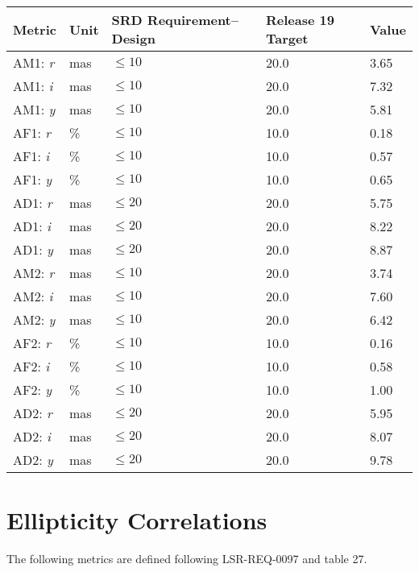 \documentclass[DM,lsstdraft,toc]{lsstdoc}
\begin{document}
\begin{longtable}{L{0.19\columnwidth}L{0.08\columnwidth}L{0.2\columnwidth}R{0.22\columnwidth}R{0.17\columnwidth}}
\toprule
Metric &
Unit &
SRD Requirement--Design &
Release 19 Target &
Value
\tabularnewline
\midrule
\endhead
AM1: \emph{r} &
mas &
\(\leq 10\) &
20.0 &
3.65
\tabularnewline
AM1: \emph{i} &
mas &
\(\leq 10\) &
20.0 &
7.32
\tabularnewline
AM1: \emph{y} &
mas &
\(\leq 10\) &
20.0 &
5.81
\tabularnewline
AF1: \emph{r} &
\% &
\(\leq 10\) &
10.0 &
0.18
\tabularnewline
AF1: \emph{i} &
\% &
\(\leq 10\) &
10.0 &
0.57
\tabularnewline
AF1: \emph{y} &
\% &
\(\leq 10\) &
10.0 &
0.65
\tabularnewline
AD1: \emph{r} &
mas &
\(\leq 20\) &
20.0 &
5.75
\tabularnewline
AD1: \emph{i} &
mas &
\(\leq 20\) &
20.0 &
8.22
\tabularnewline
AD1: \emph{y} &
mas &
\(\leq 20\) &
20.0 &
8.87
\tabularnewline
AM2: \emph{r} &
mas &
\(\leq 10\) &
20.0 &
3.74
\tabularnewline
AM2: \emph{i} &
mas &
\(\leq 10\) &
20.0 &
7.60
\tabularnewline
AM2: \emph{y} &
mas &
\(\leq 10\) &
20.0 &
6.42
\tabularnewline
AF2: \emph{r} &
\% &
\(\leq 10\) &
10.0 &
0.16
\tabularnewline
AF2: \emph{i} &
\% &
\(\leq 10\) &
10.0 &
0.58
\tabularnewline
AF2: \emph{y} &
\% &
\(\leq 10\) &
10.0 &
1.00
\tabularnewline
AD2: \emph{r} &
mas &
\(\leq 20\) &
20.0 &
5.95
\tabularnewline
AD2: \emph{i} &
mas &
\(\leq 20\) &
20.0 &
8.07
\tabularnewline
AD2: \emph{y} &
mas &
\(\leq 20\) &
20.0 &
9.78
\tabularnewline
\bottomrule
\end{longtable}

\section{Ellipticity Correlations}\label{ellipticity-correlations}


The following metrics are defined following LSR-REQ-0097
 and  table 27.
\end{document}
